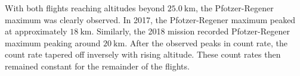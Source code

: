 %
With both flights reaching altitudes beyond $\SI{25.0}{\kilo\meter}$, the Pfotzer-Regener maximum was clearly observed.  
%
In 2017, the Pfotzer-Regener maximum peaked at approximately  $\SI{18}{\kilo\meter}$.  Similarly, the 2018 mission recorded Pfotzer-Regener maximum peaking around $\SI{20}{\kilo\meter}$. %
%
After the observed peaks in count rate, the count rate tapered off inversely with rising altitude.  These count rates then remained constant for the remainder of the flights. %

%
%
%
%

